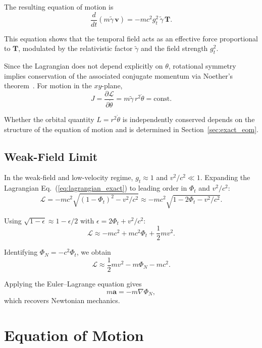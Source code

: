 \documentclass[12pt]{article}
\begin{document}
The resulting equation of motion is
\begin{equation}
\frac{d}{dt}\left(m \tilde{\gamma}\, \mathbf{v}\right)
= -mc^2 g_t^2\, \tilde{\gamma}\, \mathbf{T} .
\label{eq:eom_main}
\end{equation}

This equation shows that the temporal field acts as an effective force proportional to $\mathbf{T}$, modulated by the relativistic factor $\tilde{\gamma}$ and the field strength $g_t^2$.

Since the Lagrangian does not depend explicitly on $\theta$, rotational symmetry implies conservation of the associated conjugate momentum via Noether's theorem~\cite{Noether1918}. For motion in the $xy$-plane,
\begin{equation}
J = \frac{\partial \mathcal{L}}{\partial \dot{\theta}}
= m \tilde{\gamma}\, r^2 \dot{\theta} = \text{const}.
\label{eq:noether_charge}
\end{equation}

Whether the orbital quantity $L = r^2\dot{\theta}$ is independently conserved depends on the structure of the equation of motion and is determined in Section~\ref{sec:exact_eom}.

\subsection{Weak-Field Limit}
\label{sec:weak_field}

In the weak-field and low-velocity regime, $g_t \approx 1$ and $v^2/c^2 \ll 1$. Expanding the Lagrangian Eq.~(\ref{eq:lagrangian_exact}) to leading order in $\Phi_t$ and $v^2/c^2$:
$$
\mathcal{L} = -mc^2\sqrt{(1 - \Phi_t)^2 - v^2/c^2}
\approx -mc^2\sqrt{1 - 2\Phi_t - v^2/c^2} .
$$

Using $\sqrt{1 - \epsilon} \approx 1 - \epsilon/2$ with
$\epsilon = 2\Phi_t + v^2/c^2$:
$$
\mathcal{L} \approx -mc^2 + mc^2\Phi_t + \frac{1}{2}mv^2 .
$$

Identifying $\Phi_N = -c^2\Phi_t$, we obtain
$$
\mathcal{L} \approx \frac{1}{2}mv^2 - m\Phi_N - mc^2 .
$$

Applying the Euler--Lagrange equation gives
\begin{equation}
m\mathbf{a} = -m\nabla\Phi_N ,
\end{equation}
which recovers Newtonian mechanics.


\section{Equation of Motion}
\label{sec:eom}
\end{document}
